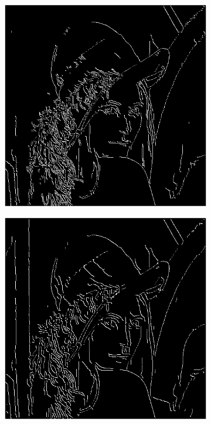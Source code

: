 \documentclass[a4paper]{article}
\begin{document}
\begin{figure}[h]

\begin{subfigure}{0.33\textwidth}
\includegraphics[width=\textwidth]{img/sigma1/lenahys.png}
\end{subfigure}
\begin{subfigure}{0.33\textwidth}
\includegraphics[width=\textwidth]{img/sigma2/lenahys.png}

\end{subfigure}
\end{figure}
\end{document}
